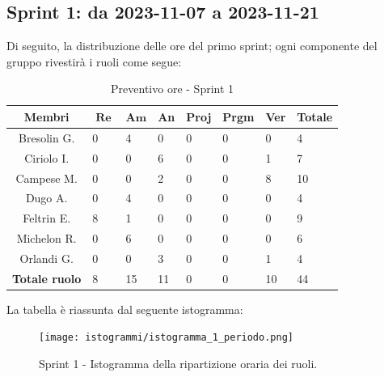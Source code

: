 \documentclass[10pt, a4paper]{article}
\begin{document}
\subsection{Sprint 1: da 2023-11-07 a 2023-11-21}

Di seguito, la distribuzione delle ore del primo sprint; ogni componente del gruppo rivestirà i ruoli come segue:
\begin{table}[H]
\begin{tabularx}{\textwidth}{c|X|X|X|X|X|X|X}
        \textbf{Membri} & $\operatorname{\textbf{Re}}$ & $\mathrm{\textbf{Am}}$ & \textbf{An} & \textbf{Proj} & \textbf{Prgm} & \textbf{Ver} & \textbf{Totale} \\
        \hline Bresolin G. & 0 & \cellcolor{primarycolor}4 & 0 & 0 & 0 & 0 & 4 \\
        \hline Ciriolo I.  & 0 & 0 & \cellcolor{primarycolor}6 & 0 & 0 & 1 & 7 \\
        \hline Campese M.  & 0 & 0 & 2 & 0 & 0 & \cellcolor{primarycolor}8 & 10 \\
        \hline Dugo A.     & 0 & \cellcolor{primarycolor}4 & 0 & 0 & 0 & 0 & 4 \\
        \hline Feltrin E.  & \cellcolor{primarycolor}8 & 1 & 0 & 0 & 0 & 0 & 9 \\
        \hline Michelon R. & 0 & \cellcolor{primarycolor}6 & 0 & 0 & 0 & 0 & 6 \\
        \hline Orlandi G.  & 0 & 0 & \cellcolor{primarycolor}3 & 0 & 0 & 1 & 4 \\
        \hline
        \textbf{Totale ruolo} & 8 & 15 & 11 & 0 & 0 & 10 & 44 
    \end{tabularx}
    \caption{Preventivo ore - Sprint 1}
    \end{table}

La tabella è riassunta dal seguente istogramma:
 \begin{figure}[H]
        \centering        
        \texttt{[image: istogrammi/istogramma\_1\_periodo.png]}
        \caption{Sprint 1 - Istogramma della ripartizione oraria dei ruoli. }
    \end{figure}
 
\end{document}
